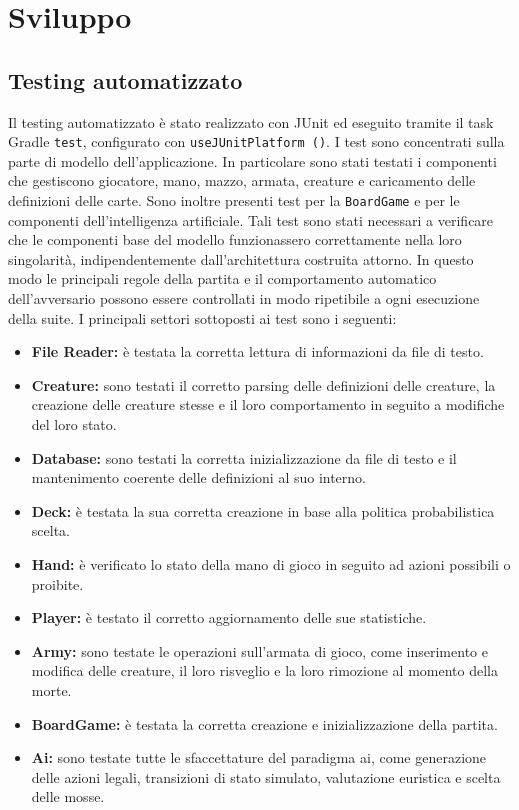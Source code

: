 \chapter{Sviluppo}

\section{Testing automatizzato}

Il testing automatizzato è stato realizzato con JUnit ed eseguito tramite il
task Gradle \texttt{test}, configurato con \texttt{useJUnitPlatform ()}. I test
sono concentrati sulla parte di modello dell'applicazione. In particolare
sono stati testati i componenti che gestiscono giocatore, mano,
mazzo, armata, creature e caricamento delle definizioni delle carte. Sono
inoltre presenti test per la \texttt{BoardGame} e per le componenti
dell'intelligenza artificiale.
Tali test sono stati necessari a verificare che le componenti base del modello
funzionassero correttamente nella loro singolarità, indipendentemente dall'architettura
costruita attorno.
In questo modo le principali regole della partita e il comportamento automatico
dell'avversario possono essere controllati in modo ripetibile a ogni esecuzione
della suite.
I principali settori sottoposti ai test sono i seguenti:
\begin{itemize}
    \item \textbf{File Reader:} è testata la corretta lettura di informazioni da file di testo.
    \item \textbf{Creature:} sono testati il corretto parsing delle definizioni delle creature, la creazione delle creature stesse e il loro comportamento in seguito a modifiche del loro stato.
    \item \textbf{Database:} sono testati la corretta inizializzazione da file di testo e il mantenimento coerente delle definizioni al suo interno.
    \item \textbf{Deck:} è testata la sua corretta creazione in base alla politica probabilistica scelta.
    \item \textbf{Hand:} è verificato lo stato della mano di gioco in seguito ad azioni possibili o proibite.
    \item \textbf{Player:} è testato il corretto aggiornamento delle sue statistiche.
    \item \textbf{Army:} sono testate le operazioni sull'armata di gioco, come inserimento e modifica delle creature, il loro risveglio e la loro rimozione al momento della morte.
    \item \textbf{BoardGame:} è testata la corretta creazione e inizializzazione della partita.
    \item \textbf{Ai:} sono testate tutte le sfaccettature del paradigma ai, come generazione delle azioni legali, transizioni di stato simulato, valutazione euristica e scelta delle mosse.
\end{itemize}

